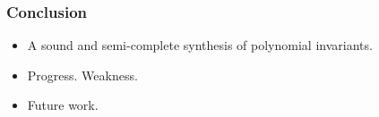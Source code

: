 \documentclass[11pt]{beamer}
\begin{document}
\begin{frame}\frametitle{Conclusion}
\begin{itemize}
\item A sound and semi-complete synthesis of polynomial invariants.
\item Progress. Weakness.
\item Future work.
\end{itemize}


\end{frame}
\end{document}
